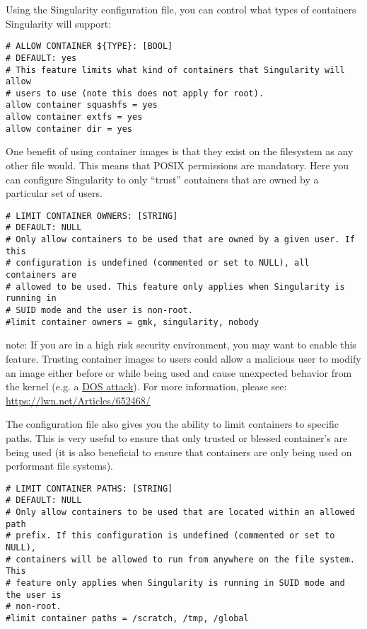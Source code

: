 \documentclass[a4paper]{article}
\newcounter{subsubsubsection}[subsubsection]
\begin{document}
Using the Singularity configuration file, you can control what types of containers Singularity will support:

\begin{lstlisting}[frame=single]
# ALLOW CONTAINER ${TYPE}: [BOOL]
# DEFAULT: yes
# This feature limits what kind of containers that Singularity will allow
# users to use (note this does not apply for root).
allow container squashfs = yes
allow container extfs = yes
allow container dir = yes

\end{lstlisting}


One benefit of using container images is that they exist on the filesystem as any other file would. This means that POSIX permissions are mandatory. Here you can configure Singularity to only “trust” containers that are owned by a particular set of users.\\[0.1in]

\begin{lstlisting}[frame=single]
# LIMIT CONTAINER OWNERS: [STRING]
# DEFAULT: NULL
# Only allow containers to be used that are owned by a given user. If this
# configuration is undefined (commented or set to NULL), all containers are
# allowed to be used. This feature only applies when Singularity is running in
# SUID mode and the user is non-root.
#limit container owners = gmk, singularity, nobody

\end{lstlisting}

note: If you are in a high risk security environment, you may want to enable this feature. Trusting container images to users could allow a malicious user to modify an image either before or while being used and cause unexpected behavior from the kernel (e.g. a \href{https://en.wikipedia.org/wiki/Denial-of-service_attack}{DOS attack}). For more information, please see: \href{https://lwn.net/Articles/652468/}{https://lwn.net/Articles/652468/}


The configuration file also gives you the ability to limit containers to specific paths. This is very useful to ensure that only trusted or blessed container’s are being used (it is also beneficial to ensure that containers are only being used on performant file systems).

\begin{lstlisting}[frame=single]
# LIMIT CONTAINER PATHS: [STRING]
# DEFAULT: NULL
# Only allow containers to be used that are located within an allowed path
# prefix. If this configuration is undefined (commented or set to NULL),
# containers will be allowed to run from anywhere on the file system. This
# feature only applies when Singularity is running in SUID mode and the user is
# non-root.
#limit container paths = /scratch, /tmp, /global
\end{lstlisting}
\end{document}
